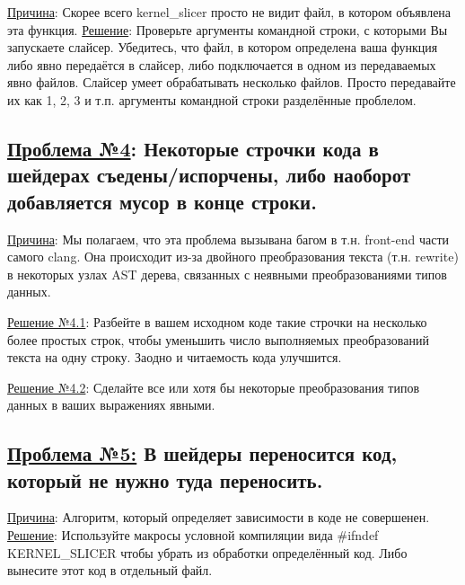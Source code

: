 \documentclass[11pt,fleqn,english,russian]{report} %
\begin{document}
\noindent\underline{Причина}: Скорее всего kernel\_slicer просто не видит файл, в котором объявлена эта функция. \underline{Решение}: Проверьте аргументы командной строки, с которыми Вы запускаете слайсер. Убедитесь, что файл, в котором определена ваша функция либо явно передаётся в слайсер, либо подключается в одном из передаваемых явно файлов. Слайсер умеет обрабатывать несколько файлов. Просто передавайте их как 1, 2, 3 и т.п. аргументы командной строки разделённые проблелом.  

\subsection{\underline{Проблема №4}: Некоторые строчки кода в шейдерах съедены/испорчены, либо наоборот добавляется мусор в конце строки.}

\noindent\underline{Причина}: Мы полагаем, что эта проблема вызывана багом в т.н. front-end части самого clang. Она происходит из-за двойного преобразования текста (т.н. rewrite) в некоторых узлах AST дерева, связанных с неявными преобразованиями типов данных. 

\vspace*{5px}
\noindent\underline{Решение №4.1}: Разбейте в вашем исходном коде такие строчки на несколько более простых строк, чтобы уменьшить число выполняемых преобразований текста на одну строку. Заодно и читаемость кода улучшится.

\vspace*{5px}
\noindent\underline{Решение №4.2}: Сделайте все или хотя бы некоторые преобразования типов данных в ваших выражениях явными. 

\subsection{\underline{Проблема №5:} В шейдеры переносится код, который не нужно туда переносить.}

\noindent\underline{Причина}: Алгоритм, который определяет зависимости в коде не совершенен. \underline{Решение}: Используйте макросы условной компиляции вида \#ifndef KERNEL\_SLICER чтобы убрать из обработки определённый код. Либо вынесите этот код в отдельный файл.  

\end{document}
